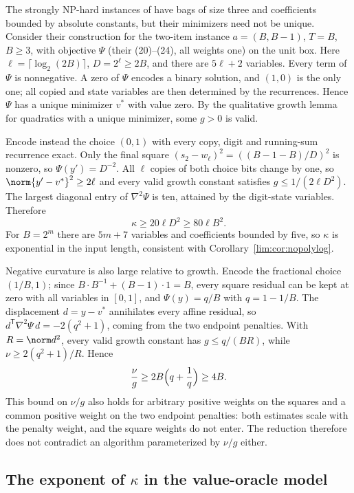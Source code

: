 \begin{remark}
\label{lim:rem:dk}
The strongly NP-hard instances of \cite[Theorem~3]{DelPiaKhajavirad2026}
have bags of size three and coefficients bounded by absolute constants,
but their minimizers need not be unique. Consider their construction for
the two-item instance $a=(B,B-1)$, $T=B$, $B\ge3$, with objective $\Psi$
(their (20)--(24), all weights one) on the unit box. Here
$\ell=\lceil\log_2(2B)\rceil$, $D=2^\ell\ge2B$, and there are $5\ell+2$
variables. Every term of $\Psi$ is nonnegative. A zero of $\Psi$ encodes a
binary solution, and $(1,0)$ is the only one; all copied and state variables
are then determined by the recurrences. Hence $\Psi$ has a unique minimizer
$v^*$ with value zero. By the qualitative growth lemma for quadratics with a
unique minimizer, some $g>0$ is valid.

Encode instead the choice $(0,1)$ with every copy, digit and running-sum
recurrence exact. Only the final square
$(s_2-w_\ell)^2=((B-1-B)/D)^2$ is nonzero, so $\Psi(y')=D^{-2}$. All
$\ell$ copies of both choice bits change by one, so
$\norm{y'-v^*}^2\ge2\ell$ and every valid growth constant satisfies
$g\le1/(2\ell D^2)$. The largest diagonal entry of $\nabla^2\Psi$ is ten,
attained by the digit-state variables. Therefore
\[
\kappa\ge20\ell D^2\ge80\ell B^2 .
\]
For $B=2^m$ there are $5m+7$ variables and coefficients bounded by five, so
$\kappa$ is exponential in the input length, consistent with
Corollary~\ref{lim:cor:nopolylog}.

Negative curvature is also large relative to growth. Encode the fractional
choice $(1/B,1)$; since $B\cdot B^{-1}+(B-1)\cdot1=B$, every square
residual can be kept at zero with all variables in $[0,1]$, and
$\Psi(y)=q/B$ with $q=1-1/B$. The displacement $d=y-v^*$ annihilates every
affine residual, so $d^{\mathsf T}\nabla^2\Psi\,d=-2(q^2+1)$, coming from the
two endpoint penalties. With $R=\norm d^2$, every valid growth constant has
$g\le q/(BR)$, while $\nu\ge2(q^2+1)/R$. Hence
\[
\frac\nu g\ge2B\Bigl(q+\frac1q\Bigr)\ge4B .
\]
This bound on $\nu/g$ also holds for arbitrary positive weights on the
squares and a common positive weight on the two endpoint penalties: both
estimates scale with the penalty weight, and the square weights do not
enter. The reduction therefore does not contradict an algorithm
parameterized by $\nu/g$ either.
\end{remark}

\subsection{The exponent of $\kappa$ in the value-oracle model}
\label{sec:limits-oracle}

